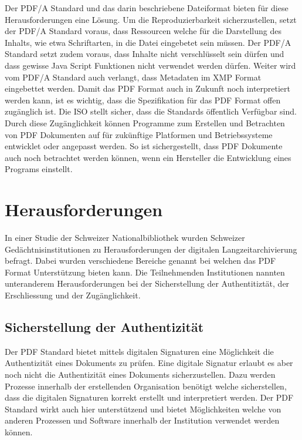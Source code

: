 \documentclass[a4paper,oneside, 12pt]{report}
\begin{document}
Der PDF/A Standard und das darin beschriebene Dateiformat bieten für diese Herausforderungen eine Lösung. Um die Reproduzierbarkeit sicherzustellen, setzt der PDF/A Standard voraus, dass Ressourcen welche für die Darstellung des Inhalts, wie etwa Schriftarten, in die Datei eingebetet sein müssen. Der PDF/A Standard setzt zudem voraus, dass Inhalte nicht verschlüsselt sein dürfen und dass gewisse Java Script Funktionen nicht verwendet werden dürfen. Weiter wird vom PDF/A Standard auch verlangt, dass Metadaten im XMP Format eingebettet werden. Damit das PDF Format auch in Zukunft noch interpretiert werden kann, ist es wichtig, dass die Spezifikation für das PDF Format offen zugänglich ist. Die \ac{ISO} stellt sicher, dass die Standards öffentlich Verfügbar sind. Durch diese Zugänglichkeit können Programme zum Erstellen und Betrachten von PDF Dokumenten auf für zukünftige Platformen und Betriebssysteme entwicklet oder angepasst werden. So ist sichergestellt, dass PDF Dokumente auch noch betrachtet werden können, wenn ein Hersteller die Entwicklung eines Programs einstellt.\cite{pdfanutshell}

 
\chapter{Herausforderungen}\label{sec:herausforderungen}
In einer Studie der Schweizer Nationalbibliothek wurden Schweizer Gedächtnisinstitutionen zu Herausforderungen der digitalen Langzeitarchivierung befragt. Dabei wurden verschiedene Bereiche genannt bei welchen das PDF Format Unterstützung bieten kann. Die Teilnehmenden Institutionen nannten unteranderem Herausforderungen bei der Sicherstellung der Authentitiztät, der Erschliessung und der Zugänglichkeit.\cite{lzaschweiz}

\section{Sicherstellung der Authentizität}
Der PDF Standard bietet mittels digitalen Signaturen eine Möglichkeit die Authentizität eines Dokuments zu prüfen. Eine digitale Signatur erlaubt es aber noch nicht die Authentizität eines Dokuments sicherzustellen. Dazu werden Prozesse innerhalb der erstellenden Organisation benötigt welche sicherstellen, dass die digitalen Signaturen korrekt erstellt und interpretiert werden. Der PDF Standard wirkt auch hier unterstützend und bietet Möglichkeiten welche von anderen Prozessen und Software innerhalb der Institution verwendet werden können.
\end{document}
